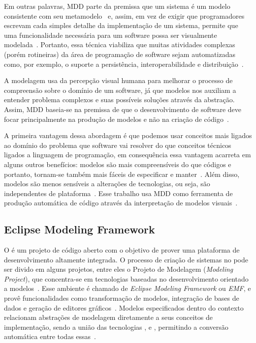Em outras palavras, MDD parte da premissa que um sistema é um modelo consistente com seu metamodelo~\cite{vujovic2014comparative} e, assim, em vez de exigir que programadores escrevam cada simples detalhe da implementação de um sistema, permite que uma funcionalidade necessária para um software possa ser visualmente modelada~\cite{atkinson2003model}. Portanto, essa técnica viabiliza que muitas atividades complexas (porém rotineiras) da área de programação de software sejam automatizadas como, por exemplo, o suporte a persistência, interoperabilidade e distribuição~\cite{atkinson2003model}.

A modelagem usa da percepção visual humana para melhorar o processo de compreensão sobre o domínio de um software, já que modelos nos auxiliam a entender problema complexos e suas possíveis soluções através da abstração. Assim, MDD baseia-se na premissa de que o desenvolvimento de software deve focar principalmente na produção de modelos e não na criação de código~\cite{selic2003pragmatics}.

A primeira vantagem dessa abordagem é que podemos usar conceitos mais ligados ao domínio do problema que software vai resolver do que conceitos técnicos ligados a linguagem de programação, em consequência essa vantagem acarreta em alguns outros benefícios: modelos são mais compreensíveis do que códigos e portanto, tornam-se também mais fáceis de especificar e manter~\cite{selic2003pragmatics}. Além disso, modelos são menos sensíveis a alterações de tecnologias, ou seja, são independentes de plataforma~\cite{selic2003pragmatics}. Esse trabalho usa MDD como ferramenta de produção automática de código através da interpretação de modelos visuais~\cite{selic2003pragmatics, viyovic2014sirius}.


\subsection{Eclipse Modeling Framework}
O \eclipse é um projeto de código aberto com o objetivo de prover uma plataforma de desenvolvimento altamente integrada. O processo de criação de sistemas no \eclipse pode ser divido em alguns projetos, entre eles o Projeto de Modelagem (\textit{Modeling Project}), que concentra-se em tecnologias baseadas no desenvolvimento orientado a modelos~\cite{steinberg2008emf}. Esse ambiente é chamado de \textit{Eclipse Modeling Framework} ou \textit{EMF}, e provê funcionalidades como transformação de modelos, integração de bases de dados e geração de editores gráficos~\cite{steinberg2008emf}. Modelos especificados dentro do contexto \emf relacionam abstrações de modelagem diretamente a seus conceitos de implementação, sendo a união das tecnologias \uml, \xml e \java, permitindo a conversão automática entre todas essas~\cite{steinberg2008emf}. 

